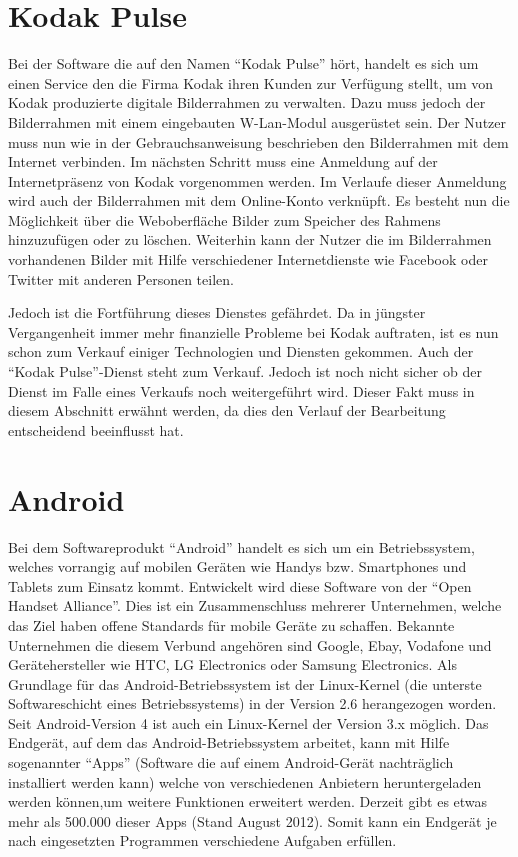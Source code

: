 \begin{flushleft}
\section{Kodak Pulse}
Bei der Software die auf den Namen ``Kodak Pulse'' hört, handelt es sich um einen Service den die Firma Kodak ihren Kunden zur Verfügung stellt, um von Kodak produzierte digitale Bilderrahmen zu verwalten. Dazu muss jedoch der Bilderrahmen mit einem eingebauten W-Lan-Modul ausgerüstet sein. Der Nutzer muss nun wie in der Gebrauchsanweisung beschrieben den Bilderrahmen mit dem Internet verbinden. Im nächsten Schritt muss eine Anmeldung auf der Internetpräsenz von Kodak vorgenommen werden. Im Verlaufe dieser Anmeldung wird auch der Bilderrahmen mit dem Online-Konto verknüpft. Es besteht nun die Möglichkeit über die Weboberfläche Bilder zum Speicher des Rahmens hinzuzufügen oder zu löschen. Weiterhin kann der Nutzer die im Bilderrahmen vorhandenen Bilder mit Hilfe verschiedener Internetdienste wie Facebook oder Twitter mit anderen Personen teilen.

Jedoch ist die Fortführung dieses Dienstes gefährdet. Da in jüngster Vergangenheit immer mehr finanzielle Probleme bei Kodak auftraten, ist es nun schon zum Verkauf einiger Technologien und Diensten gekommen. Auch der ``Kodak Pulse''-Dienst steht zum Verkauf. Jedoch ist noch nicht sicher ob der Dienst im Falle eines Verkaufs noch weitergeführt wird. Dieser Fakt muss in diesem Abschnitt erwähnt werden, da dies den Verlauf der Bearbeitung entscheidend beeinflusst hat. 

\section{Android}
Bei dem Softwareprodukt ``Android'' handelt es sich um ein Betriebssystem, welches vorrangig auf mobilen Geräten wie Handys bzw. Smartphones und Tablets zum Einsatz kommt. Entwickelt wird diese Software von der ``Open Handset Alliance''. Dies ist ein Zusammenschluss mehrerer Unternehmen, welche das Ziel haben offene Standards für mobile Geräte zu schaffen. Bekannte Unternehmen die diesem Verbund angehören sind Google, Ebay, Vodafone und Gerätehersteller wie HTC, LG Electronics oder Samsung Electronics. 
Als Grundlage für das Android-Betriebssystem ist der Linux-Kernel (die unterste Softwareschicht eines Betriebssystems) in der Version 2.6 herangezogen worden. Seit Android-Version 4 ist auch ein Linux-Kernel der Version 3.x möglich. 
Das Endgerät, auf dem das Android-Betriebssystem arbeitet, kann mit Hilfe sogenannter ``Apps'' (Software die auf einem Android-Gerät nachträglich installiert werden kann) welche von verschiedenen Anbietern heruntergeladen werden können,um weitere Funktionen erweitert werden. Derzeit gibt es etwas mehr als 500.000 dieser Apps (Stand August 2012). Somit kann ein Endgerät je nach eingesetzten Programmen verschiedene Aufgaben erfüllen. 


\end{flushleft}
